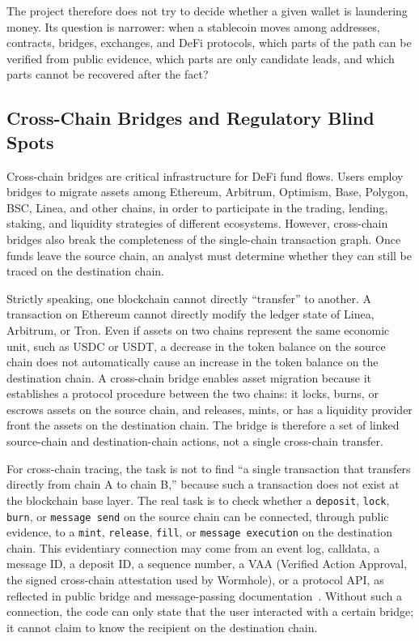 \documentclass[12pt,a4paper]{article}
\begin{document}
The project therefore does not try to decide whether a given wallet is laundering money. Its question is narrower: when a stablecoin moves among addresses, contracts, bridges, exchanges, and DeFi protocols, which parts of the path can be verified from public evidence, which parts are only candidate leads, and which parts cannot be recovered after the fact?

\subsection{Cross-Chain Bridges and Regulatory Blind Spots}

Cross-chain bridges are critical infrastructure for DeFi fund flows. Users employ bridges to migrate assets among Ethereum, Arbitrum, Optimism, Base, Polygon, BSC, Linea, and other chains, in order to participate in the trading, lending, staking, and liquidity strategies of different ecosystems. However, cross-chain bridges also break the completeness of the single-chain transaction graph. Once funds leave the source chain, an analyst must determine whether they can still be traced on the destination chain.

Strictly speaking, one blockchain cannot directly ``transfer'' to another. A transaction on Ethereum cannot directly modify the ledger state of Linea, Arbitrum, or Tron. Even if assets on two chains represent the same economic unit, such as USDC or USDT, a decrease in the token balance on the source chain does not automatically cause an increase in the token balance on the destination chain. A cross-chain bridge enables asset migration because it establishes a protocol procedure between the two chains: it locks, burns, or escrows assets on the source chain, and releases, mints, or has a liquidity provider front the assets on the destination chain. The bridge is therefore a set of linked source-chain and destination-chain actions, not a single cross-chain transfer.

For cross-chain tracing, the task is not to find ``a single transaction that transfers directly from chain A to chain B,'' because such a transaction does not exist at the blockchain base layer. The real task is to check whether a \texttt{deposit}, \texttt{lock}, \texttt{burn}, or \texttt{message send} on the source chain can be connected, through public evidence, to a \texttt{mint}, \texttt{release}, \texttt{fill}, or \texttt{message execution} on the destination chain. This evidentiary connection may come from an event log, calldata, a message ID, a deposit ID, a sequence number, a VAA (Verified Action Approval, the signed cross-chain attestation used by Wormhole), or a protocol API, as reflected in public bridge and message-passing documentation~\cite{wormholeTokenTransfers2026,acrossApiDocs2026,layerzeroScanDocs2026}. Without such a connection, the code can only state that the user interacted with a certain bridge; it cannot claim to know the recipient on the destination chain.
\end{document}
